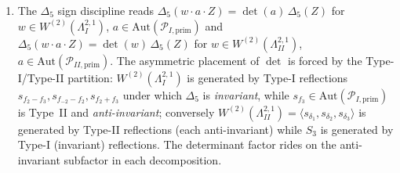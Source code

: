 \begin{lemma}
\begin{enumerate}
$s_{f_3}$) and $|\mathrm{Aut}(\mathcal{P}_{II,\mathrm{prim}})| = 6$.
\item The $\Delta_5$ sign discipline reads
$\Delta_5(w \cdot a \cdot Z) = \det(a)\,\Delta_5(Z)$ for
$w \in W^{(2)}(\Lambda^{2,1}_I)$,
$a \in \mathrm{Aut}(\mathcal{P}_{I,\mathrm{prim}})$ and
$\Delta_5(w \cdot a \cdot Z) = \det(w)\,\Delta_5(Z)$ for
$w \in W^{(2)}(\Lambda^{2,1}_{II})$,
$a \in \mathrm{Aut}(\mathcal{P}_{II,\mathrm{prim}})$. The asymmetric
placement of $\det$ is forced by the Type-I/Type-II partition:
$W^{(2)}(\Lambda^{2,1}_I)$ is generated by Type-I reflections
$s_{f_2-f_3}, s_{f_{-2}-f_2}, s_{f_2+f_3}$ under which $\Delta_5$ is
\emph{invariant}, while $s_{f_3} \in \mathrm{Aut}(\mathcal{P}_{I,
\mathrm{prim}})$ is Type~II and \emph{anti-invariant}; conversely
$W^{(2)}(\Lambda^{2,1}_{II}) = \langle s_{\delta_1}, s_{\delta_2},
s_{\delta_3}\rangle$ is generated by Type-II reflections (each
anti-invariant) while $S_3$ is generated by Type-I (invariant)
reflections. The determinant factor rides on the anti-invariant
subfactor in each decomposition.
\end{enumerate}
\end{lemma}

